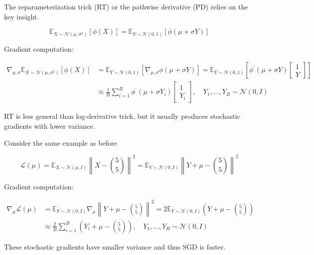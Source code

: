 \documentclass{report}
\begin{document}
\begin{definition}
    The reparameterization trick (RT) or the pathwise derivative (PD) relies on the key insight.

    $$
    \mathbb{E}_{X \sim \mathcal{N}\left(\mu, \sigma^{2}\right)}[\phi(X)]=\mathbb{E}_{Y \sim \mathcal{N}(0,1)}[\phi(\mu+\sigma Y)]
    $$

    Gradient computation:

    $$
    \begin{aligned}
    \nabla_{\mu, \sigma} \mathbb{E}_{X \sim \mathcal{N}\left(\mu, \sigma^{2}\right)}[\phi(X)] & =\mathbb{E}_{Y \sim \mathcal{N}(0,1)}\left[\nabla_{\mu, \sigma} \phi(\mu+\sigma Y)\right]=\mathbb{E}_{Y \sim \mathcal{N}(0,1)}\left[\phi^{\prime}(\mu+\sigma Y)\left[\begin{array}{c}
    1 \\
    Y
    \end{array}\right]\right] \\
    & \approx \frac{1}{B} \sum_{i=1}^{B} \phi^{\prime}\left(\mu+\sigma Y_{i}\right)\left[\begin{array}{c}
    1 \\
    Y_{i}
    \end{array}\right], \quad Y_{1}, \ldots, Y_{B} \sim \mathcal{N}(0, I)
    \end{aligned}
    $$

    RT is less general than log-derivative trick, but it usually produces stochastic gradients with lower variance.
\end{definition}

\begin{example}
    Consider the same example as before

    $$
    \mathcal{L}(\mu)=\mathbb{E}_{X \sim \mathcal{N}(\mu, I)}\left\|X-\binom{5}{5}\right\|^{2}=\mathbb{E}_{Y \sim \mathcal{N}(0, I)}\left\|Y+\mu-\binom{5}{5}\right\|^{2}
    $$

    Gradient computation:

    $$
    \begin{aligned}
    \nabla_{\mu} \mathcal{L}(\mu) & =\mathbb{E}_{Y \sim \mathcal{N}(0, I)} \nabla_{\mu}\left\|Y+\mu-\binom{5}{5}\right\|^{2}=2 \mathbb{E}_{Y \sim \mathcal{N}(0, I)}\left(Y+\mu-\binom{5}{5}\right) \\
    & \approx \frac{2}{B} \sum_{i=1}^{B}\left(Y_{i}+\mu-\binom{5}{5}\right), \quad Y_{1}, \ldots, Y_{B} \sim \mathcal{N}(0, I)
    \end{aligned}
    $$

    These stochastic gradients have smaller variance and thus SGD is faster.
\end{example}
\end{document}
